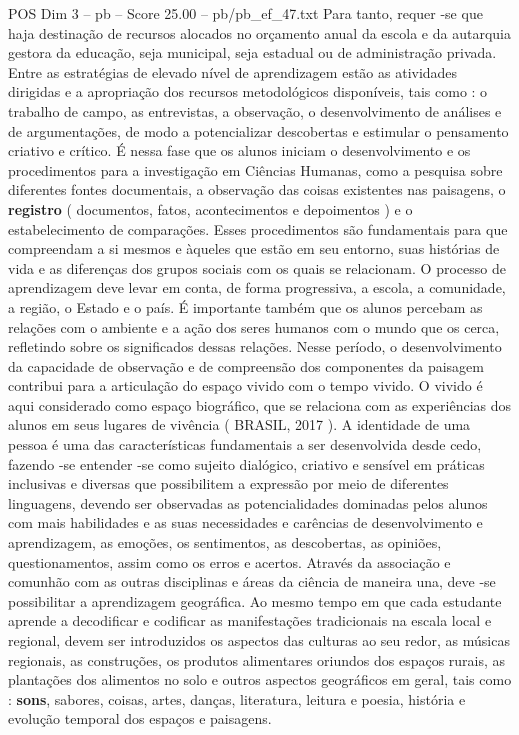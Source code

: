 \begin{textsample}{POS Dim 3 – pb – Score 25.00 – pb/pb\_ef\_47.txt}
Para tanto, requer -se que haja destinação de recursos alocados no orçamento anual da escola e da autarquia gestora da educação, seja municipal, seja estadual ou de administração privada.
Entre as estratégias de elevado nível de aprendizagem estão as atividades dirigidas e a apropriação dos recursos metodológicos disponíveis, tais como : o trabalho de campo, as entrevistas, a observação, o desenvolvimento de análises e de argumentações, de modo a potencializar descobertas e estimular o pensamento criativo e crítico.
É nessa fase que os alunos iniciam o desenvolvimento e os procedimentos para a investigação em Ciências Humanas, como a pesquisa sobre diferentes fontes documentais, a observação das coisas existentes nas paisagens, o \textbf{registro} ( documentos, fatos, acontecimentos e depoimentos ) e o estabelecimento de comparações.
Esses procedimentos são fundamentais para que compreendam a si mesmos e àqueles que estão em seu entorno, suas histórias de vida e as diferenças dos grupos sociais com os quais se relacionam.
O processo de aprendizagem deve levar em conta, de forma progressiva, a escola, a comunidade, a região, o Estado e o país.
É importante também que os alunos percebam as relações com o ambiente e a ação dos seres humanos com o mundo que os cerca, refletindo sobre os significados dessas relações.
Nesse período, o desenvolvimento da capacidade de observação e de compreensão dos componentes da paisagem contribui para a articulação do espaço vivido com o tempo vivido.
O vivido é aqui considerado como espaço biográfico, que se relaciona com as experiências dos alunos em seus lugares de vivência ( BRASIL, 2017 ).
A identidade de uma pessoa é uma das características fundamentais a ser desenvolvida desde cedo, fazendo -se entender -se como sujeito dialógico, criativo e sensível em práticas inclusivas e diversas que possibilitem a expressão por meio de diferentes linguagens, devendo ser observadas as potencialidades dominadas pelos alunos com mais habilidades e as suas necessidades e carências de desenvolvimento e aprendizagem, as emoções, os sentimentos, as descobertas, as opiniões, questionamentos, assim como os erros e acertos.
Através da associação e comunhão com as outras disciplinas e áreas da ciência de maneira una, deve -se possibilitar a aprendizagem geográfica.
Ao mesmo tempo em que cada estudante aprende a decodificar e codificar as manifestações tradicionais na escala local e regional, devem ser introduzidos os aspectos das culturas ao seu redor, as músicas regionais, as construções, os produtos alimentares oriundos dos espaços rurais, as plantações dos alimentos no solo e outros aspectos geográficos em geral, tais como : \textbf{sons}, sabores, coisas, artes, danças, literatura, leitura e poesia, história e evolução temporal dos espaços e paisagens.

\end{textsample}
